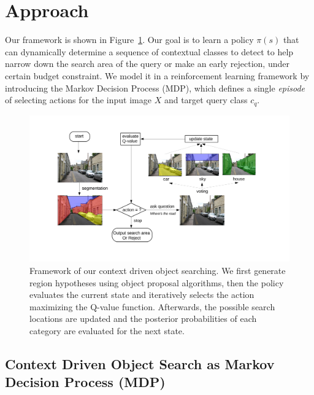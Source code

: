 \section{Approach}

Our framework is shown in Figure~\ref{fig:flowchart}. Our goal is to learn a policy $\pi(s)$ that can dynamically determine a sequence of contextual classes to detect to help narrow down the search area of the query or make an early rejection, under certain budget constraint. We model it in a reinforcement learning framework by introducing the Markov Decision Process (MDP), which defines a single \textit{episode} of selecting actions for the input image $X$ and target query class $c_q$.

\begin{figure}[htb]
\begin{center}
\includegraphics[width=\linewidth]{figures/flowchart_Q.pdf}
\caption{Framework of our context driven object searching. We first generate region hypotheses using object proposal algorithms, then the policy evaluates the current state and iteratively selects the action maximizing the Q-value function. Afterwards, the possible search locations are updated and the posterior probabilities of each category are evaluated for the next state.}
\end{center}

\label{fig:flowchart}
\end{figure}

\subsection{Context Driven Object Search as Markov Decision Process (MDP)}
\label{sec:policy}

